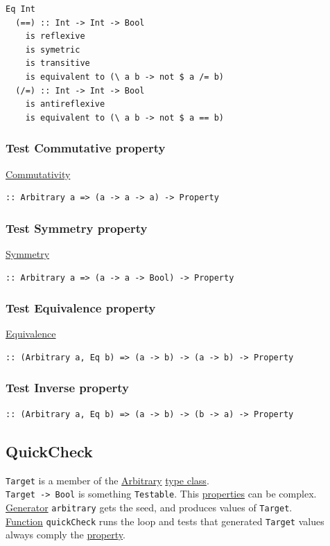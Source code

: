 \documentclass[a4paper,14pt,oneside]{book}
\begin{document}
\begin{verbatim}
Eq Int
  (==) :: Int -> Int -> Bool
    is reflexive
    is symetric
    is transitive
    is equivalent to (\ a b -> not $ a /= b)
  (/=) :: Int -> Int -> Bool
    is antireflexive
    is equivalent to (\ a b -> not $ a == b)
\end{verbatim}

\subsubsection{\label{org4d1d835}Test Commutative property}
\label{sec:org2c8f180}
\hyperref[orgb4c5d86]{Commutativity}\\
\begin{verbatim}
:: Arbitrary a => (a -> a -> a) -> Property
\end{verbatim}

\subsubsection{\label{orgf61f1bc}Test Symmetry property}
\label{sec:org46d8b49}
\hyperref[org941d875]{Symmetry}\\
\begin{verbatim}
:: Arbitrary a => (a -> a -> Bool) -> Property
\end{verbatim}

\subsubsection{\label{org4833a17}Test Equivalence property}
\label{sec:orgc06743c}
\hyperref[org663eda7]{Equivalence}\\
\begin{verbatim}
:: (Arbitrary a, Eq b) => (a -> b) -> (a -> b) -> Property
\end{verbatim}

\subsubsection{\label{org67ffe67}Test Inverse property}
\label{sec:org6ae1ddb}
\begin{verbatim}
:: (Arbitrary a, Eq b) => (a -> b) -> (b -> a) -> Property
\end{verbatim}

\subsection{\label{org7a8d4a0}QuickCheck}
\label{sec:orgf72572a}
\texttt{Target} is a member of the \hyperref[orgec6a824]{Arbitrary} \hyperref[org904b85b]{type class}.\\
\texttt{Target -> Bool} is something \texttt{Testable}. This \hyperref[org1feb373]{properties} can be complex.\\
\hyperref[org8c8d3b6]{Generator} \texttt{arbitrary} gets the seed, and produces values of \texttt{Target}.\\
\hyperref[org8cc2ae4]{Function} \texttt{quickCheck} runs the loop and tests that generated \texttt{Target} values always comply the \hyperref[org91a1c9f]{property}.\\
\end{document}
